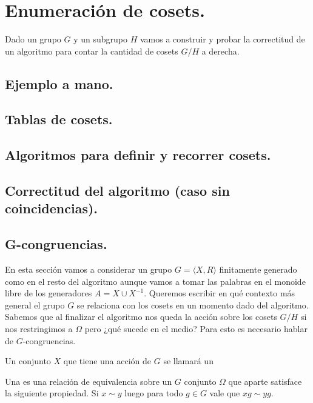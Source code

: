\documentclass[tesis.tex]{subfiles}
\begin{document}
\chapter{Enumeración de cosets.}

Dado un grupo  $G$ y un subgrupo $H$  vamos a construir y probar la correctitud de un algoritmo para contar la cantidad de cosets $G/H$ a derecha.


\section{Ejemplo a mano.}

\section{Tablas de cosets.}

\section{Algoritmos para definir y recorrer cosets.}


\section{Correctitud del algoritmo (caso sin coincidencias).}

\section{G-congruencias.}
En esta sección vamos a considerar un grupo $G = \langle X, R \rangle$ finitamente generado como en el resto del algoritmo aunque vamos a tomar las palabras en el monoide libre de los generadores $A = X \cup X^{-1}$.
Queremos escribir en qué contexto más general el grupo $G$ se relaciona con los cosets en un momento dado del algoritmo. 
Sabemos que al finalizar el algoritmo nos queda la acción sobre los cosets $G/H$ si nos restringimos a $\Omega$ pero ¿qué sucede en el medio?
Para esto es necesario hablar de $G$-congruencias.
\begin{deff}
    Un conjunto $X$ que tiene una acción de $G$ se llamará un 
\end{deff}



\begin{deff}
    Una  es una relación de equivalencia sobre un $G$ conjunto $\Omega$ que aparte satisface la siguiente propiedad.
    Si $x \sim y$ luego para todo $g \in G$ vale que $xg \sim yg$.
\end{deff}
\end{document}
